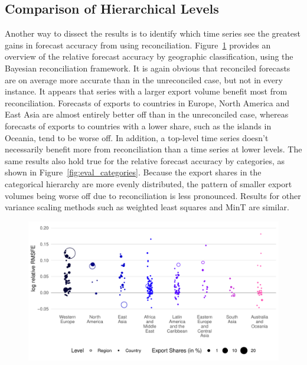\documentclass[a4paper,fleqn,11pt]{article}
\begin{document}
\subsection{Comparison of Hierarchical Levels}
Another way to dissect the results is to identify which time series see the greatest gains in forecast accuracy from using reconciliation. Figure~\ref{fig:eval_regions} provides an overview of the relative forecast accuracy by geographic classification, using the Bayesian reconciliation framework. It is again obvious that reconciled forecasts are on average more accurate than in the unreconciled case, but not in every instance. It appears that series with a larger export volume benefit most from reconciliation. Forecasts of exports to countries in Europe, North America and East Asia are almost entirely better off than in the unreconciled case, whereas forecasts of exports to countries with a lower share, such as the islands in Oceania, tend to be worse off. In addition, a top-level time series doesn't necessarily benefit more from reconciliation than a time series at lower levels. The same results also hold true for the relative forecast accuracy by categories, as shown in Figure~\ref{fig:eval_categories}. Because the export shares in the categorical hierarchy are more evenly distributed, the pattern of smaller export volumes being worse off due to reconciliation is less pronounced. Results for other variance scaling methods such as weighted least squares and MinT are similar.

\begin{figure}[H]
	\includegraphics[width=\textwidth]{fig/fig_eval_regions}
	\label{fig:eval_regions}
\end{figure}
\end{document}
